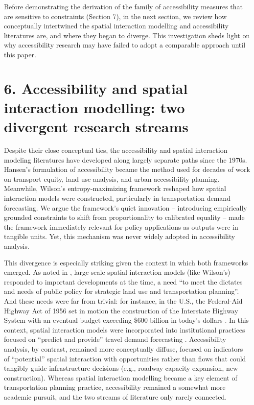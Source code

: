 \documentclass[
  10pt,
  letterpaper,
]{article}
\begin{document}
Before demonstrating the derivation of the family of accessibility
measures that are sensitive to constraints (Section 7), in the next
section, we review how conceptually intertwined the spatial interaction
modelling and accessibility literatures are, and where they began to
diverge. This investigation sheds light on why accessibility research
may have failed to adopt a comparable approach until this paper.

\section{6. Accessibility and spatial interaction modelling: two
divergent research
streams}\label{accessibility-and-spatial-interaction-modelling-two-divergent-research-streams}

Despite their close conceptual ties, the accessibility and spatial
interaction modeling literatures have developed along largely separate
paths since the 1970s. Hansen's \citep{hansen1959} formulation of
accessibility became the method used for decades of work on transport
equity, land use analysis, and urban accessibility planning. Meanwhile,
Wilson's \citep{wilson1971} entropy-maximizing framework reshaped how
spatial interaction models were constructed, particularly in
transportation demand forecasting. We argue the framework's quiet
innovation -- introducing empirically grounded constraints to shift from
proportionality to calibrated equality -- made the framework immediately
relevant for policy applications as outputs were in tangible units. Yet,
this mechanism was never widely adopted in accessibility analysis.

This divergence is especially striking given the context in which both
frameworks emerged. As noted in
\citep{battyChronicleScientificPlanning1994}, large-scale spatial
interaction models (like Wilson's) responded to important developments
at the time, a need ``to meet the dictates and needs of public policy
for strategic land use and transportation planning''. And these needs
were far from trivial: for instance, in the U.S., the Federal-Aid
Highway Act of 1956 set in motion the construction of the Interstate
Highway System with an eventual budget exceeding \$600 billion in
today's dollars
\citep{weinerUrbanTransportationPlanning2016, mdotMnDOTJoins2007}. In
this context, spatial interaction models were incorporated into
institutional practices focused on ``predict and provide'' travel demand
forecasting
\citep{kovatch1971modeling, weinerUrbanTransportationPlanning2016}.
Accessibility analysis, by contrast, remained more conceptually diffuse,
focused on indicators of ``potential'' spatial interaction with
opportunities rather than flows that could tangibly guide infrastructure
decisions (e.g., roadway capacity expansion, new construction). Whereas
spatial interaction modelling became a key element of transportation
planning practice, accessibility remained a somewhat more academic
pursuit, and the two streams of literature only rarely connected.
\end{document}
